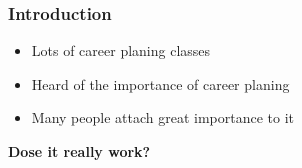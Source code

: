 \begin{frame}
    \frametitle{Introduction}
    \Large
    \begin{itemize}[<+->]
        \item Lots of career planing classes
        \item Heard of the importance of career planing
        \item Many people attach great importance to it
    \end{itemize}
    \begin{center}
        \LARGE
        \textbf{Dose it really work?} 
    \end{center}
\end{frame}